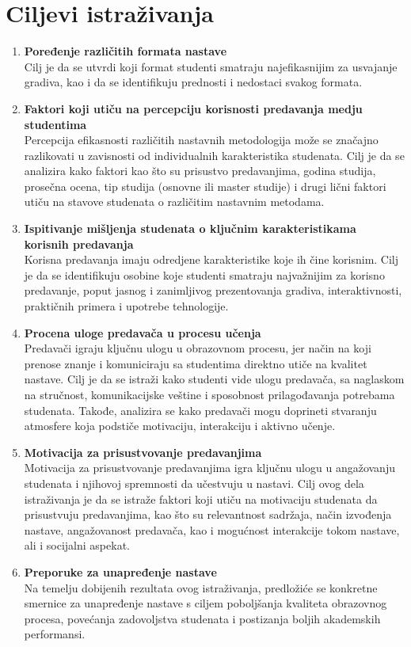 \documentclass{article}
\begin{document}
\section{Ciljevi istraživanja}
\begin{enumerate}
    \item \textbf{Poređenje različitih formata nastave} \\
Cilj je da se utvrdi koji format studenti smatraju najefikasnijim za usvajanje gradiva, kao i da se identifikuju prednosti i nedostaci svakog formata.
    \item \textbf{Faktori koji utiču na percepciju korisnosti predavanja medju studentima} \\
    Percepcija efikasnosti različitih nastavnih metodologija može se značajno razlikovati u zavisnosti od individualnih karakteristika studenata. Cilj je da se analizira kako faktori kao što su prisustvo predavanjima, godina studija, prosečna ocena, tip studija (osnovne ili master studije) i drugi lični faktori utiču na stavove studenata o različitim nastavnim metodama. 
    \item \textbf{Ispitivanje mišljenja studenata o ključnim karakteristikama korisnih predavanja} \\
    Korisna predavanja imaju odredjene karakteristike koje ih čine korisnim. Cilj je da se identifikuju osobine koje studenti smatraju najvažnijim za korisno predavanje, poput jasnog i zanimljivog prezentovanja gradiva, interaktivnosti, praktičnih primera i upotrebe tehnologije.
    \item \textbf{Procena uloge predavača u procesu učenja} \\
    Predavači igraju ključnu ulogu u obrazovnom procesu, jer način na koji prenose znanje i komuniciraju sa studentima direktno utiče na kvalitet nastave. Cilj je da se istraži kako studenti vide ulogu predavača, sa naglaskom na stručnost, komunikacijske veštine i sposobnost prilagođavanja potrebama studenata. Takođe, analizira se kako predavači mogu doprineti stvaranju atmosfere koja podstiče motivaciju, interakciju i aktivno učenje. \\
    \item \textbf{Motivacija za prisustvovanje predavanjima} \\
     Motivacija za prisustvovanje predavanjima igra ključnu ulogu u angažovanju studenata i njihovoj spremnosti da učestvuju u nastavi. Cilj ovog dela istraživanja je da se istraže faktori koji utiču na motivaciju studenata da prisustvuju predavanjima, kao što su relevantnost sadržaja, način izvođenja nastave, angažovanost predavača, kao i mogućnost interakcije tokom nastave, ali i socijalni aspekat. \\
     \item \textbf{Preporuke za unapređenje nastave} \\
     Na temelju dobijenih rezultata ovog istraživanja, predložiće se konkretne smernice za unapređenje nastave s ciljem poboljšanja kvaliteta obrazovnog procesa, povećanja zadovoljstva studenata i postizanja boljih akademskih performansi. 
\end{enumerate}
\end{document}
